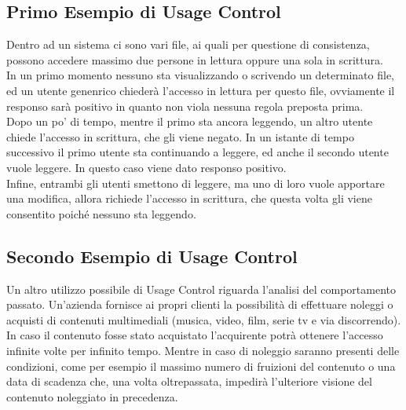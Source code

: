\subsection*{Primo Esempio di Usage Control} %
Dentro ad un sistema ci sono vari file, ai quali per questione di consistenza, possono accedere massimo due persone in lettura oppure una sola in scrittura.\\
In un primo momento nessuno sta visualizzando o scrivendo un determinato file, ed un utente genenrico 
chiederà l'accesso in lettura per questo file, ovviamente il responso sarà positivo in quanto non viola nessuna regola preposta prima.\\
Dopo un po' di tempo, mentre il primo sta ancora leggendo, un altro utente chiede l'accesso in scrittura, che gli viene negato.
In un istante di tempo successivo il primo utente sta continuando a leggere, ed anche il secondo utente vuole leggere. In questo caso viene dato responso positivo.\\
Infine, entrambi gli utenti smettono di leggere, ma uno di loro vuole apportare una modifica, allora richiede l'accesso in scrittura, che questa volta gli viene consentito poiché nessuno sta leggendo.

\subsection*{Secondo Esempio di Usage Control}
Un altro utilizzo possibile di Usage Control riguarda l'analisi del comportamento passato. Un'azienda fornisce  ai propri clienti 
la possibilità di effettuare noleggi o acquisti di contenuti multimediali (musica, video, film, serie tv e via discorrendo).\\
In caso il contenuto fosse stato acquistato l'acquirente potrà ottenere l'accesso infinite volte per infinito tempo. Mentre in caso di noleggio
saranno presenti delle condizioni, come per esempio il massimo numero di fruizioni del contenuto o una data di scadenza che, una volta oltrepassata, impedirà l'ulteriore visione del contenuto noleggiato in precedenza.







